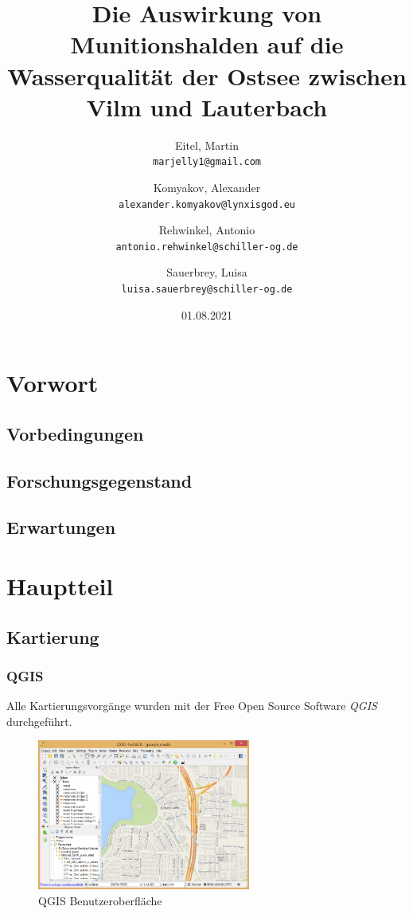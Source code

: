 \documentclass[12pt,titlepage]{scrreprt}
\begin{document}
\begin{titlepage}
\title{Die Auswirkung von Munitionshalden auf die Wasserqualität der Ostsee zwischen Vilm und Lauterbach}
\date{01.08.2021}
\author{Eitel, Martin \\ \texttt{marjelly1@gmail.com}\and Komyakov, Alexander \\\texttt{alexander.komyakov@lynxisgod.eu} \\ \and Rehwinkel, Antonio \\ \texttt{antonio.rehwinkel@schiller-og.de} \\ \and Sauerbrey, Luisa \\ \texttt{luisa.sauerbrey@schiller-og.de}}
\maketitle
\end{titlepage}
\tableofcontents

\chapter{Vorwort}
\section{Vorbedingungen}
\section{Forschungsgegenstand}
\section{Erwartungen}
\chapter{Hauptteil}
\section{Kartierung}
    \subsection*{QGIS}
    Alle Kartierungsvorgänge wurden mit der Free Open Source Software \emph{QGIS}\cite{qgis} durchgeführt.
    \begin{figure}[h]
        \centering
        \includegraphics[width=7cm]{QGIS/about-screenshot.png}
        \caption{QGIS Benutzeroberfläche}
        \label{fig:qgis_scr0}
    \end{figure}
\end{document}
